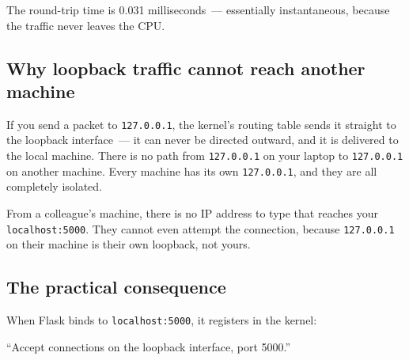 \begin{codebox}[short]

\begin{Shaded}
\begin{Highlighting}[]
\end{Highlighting}
\end{Shaded}

\end{codebox}

\noindent{}The round-trip time is 0.031 milliseconds~--- essentially instantaneous, because the traffic never leaves the CPU.

\subsection*{Why loopback traffic cannot reach another machine}\label{10-networking-limitations:why-loopback-traffic-cannot-reach-another-machine}

If you send a packet to \texttt{127.0.0.1}, the kernel's routing table sends it straight to the loopback interface~--- it can never be directed outward, and it is delivered to the local machine. There is no path from \texttt{127.0.0.1} on your laptop to \texttt{127.0.0.1} on another machine. Every machine has its own \texttt{127.0.0.1}, and they are all completely isolated.

From a colleague's machine, there is no IP address to type that reaches your \texttt{localhost:5000}. They cannot even attempt the connection, because \texttt{127.0.0.1} on their machine is their own loopback, not yours.

\subsection*{The practical consequence}\label{10-networking-limitations:the-practical-consequence}

When Flask binds to \texttt{localhost:5000}, it registers in the kernel:

\begin{notebox}

``Accept connections on the loopback interface, port 5000.''

\end{notebox}

